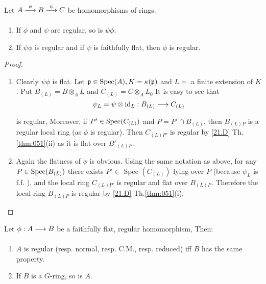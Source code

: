 \documentclass[../main]{subfiles}
\begin{document}
\begin{parlemma}\label{lem:33.01} Let $A \varrightarrow{\phi} B\varrightarrow{\psi} C$ be homomorphisms of rings.
\begin{enumerate}
    \item If $\phi$ and $\psi$ are regular, so is $\psi \phi$.
    \item If $\psi \phi$ is regular and if $\psi$ is faithfully flat, then $\phi$ is regular.
\end{enumerate}
\end{parlemma}
\begin{proof} 
\begin{enumerate}
    \item Clearly $\psi \phi$ is flat. Let $\mathfrak{p} \in \operatorname{Spec}(A), K=\kappa(\mathfrak{p})$ and $L=$ a finite extension of $K $. Put $B_{(L)} = B\otimes_A L$ and $C_{(L)}=C \otimes_A L_0$ It is easy to see that
    \[
    \psi_L=\psi \otimes \id_L:B_{(L)} \varrightarrow{} C_{(L)}
    \]
    is regular, Moreover, if $P' \in \operatorname{Spec}(C_{(L)})$ and $P=P' \cap B_{(L)}$, then $B_{(L)P}$ is a regular local ring (as $\phi$ is regular). Then
    $C_{(L)P'}$ is regular by \ref{21.D} Th.\ref{thm:051}(ii) as it is flat over $B'_{(L)P}$.
    \item Again the flatness of $\phi$ is obvious. Using the same notation as above, for any $P \in \operatorname{Spec}(B_{(L)})$ there exists $P' \in$ Spec $(C_{(L)})$ lying over $P$ (because $\psi_L$ is f.f. ), and the local ring $C_{(L)P'}$ is regular and flat over $B_{(L)P}$. Therefore the local ring $B_{(L)P}$ is regular by \ref{21.D} Th.\ref{thm:051}(i).
\end{enumerate}
\end{proof}

\begin{lemma} \label{lem:33.02}
Let $\phi: A \varrightarrow{} B$ be a faithfully flat, regular homomorphism, Then:
\begin{enumerate}
    \item $A$ is regular (resp. normal, resp. C.M., resp. reduced) iff $B$ has the same property.

    \item If $B$ is a $G$-ring, so is $A$.\end{enumerate}
\end{lemma}
\end{document}
